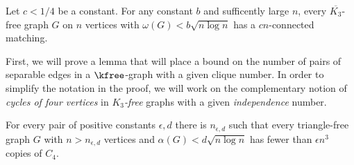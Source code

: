 \begin{theorem}
Let $c < 1/4$ be a constant.  For any constant $b$ and sufficently large $n$, every $\overline{K_3}$-free graph $G$ on $n$ vertices with $\omega(G) < b\sqrt{n\log n}$ has a $cn$-connected matching.
\label{sm_cli}
\end{theorem}

First, we will prove a lemma that will place a bound on the number of pairs of separable edges in a $\kfree$-graph with a given clique number.  In order to simplify the notation in the proof, we will work on the complementary notion of {\it cycles of four vertices} in {\it $K_3$-free} graphs with a given {\it independence} number.  

\begin{lem}
For every pair of positive constants $\epsilon, d$ there is $n_{\epsilon, d}$ such that every triangle-free graph $G$ with $n > n_{\epsilon, d}$ vertices and $\alpha(G) < d\sqrt{n\log n}$ has fewer than $\epsilon n^3$ copies of $C_4$.
\end{lem}
